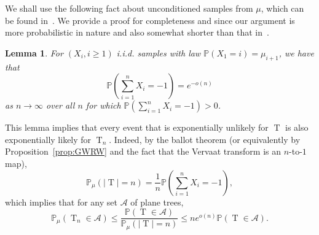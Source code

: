\documentclass[10pt]{amsart}
\newtheorem{lemm}[theo]{Lemma}
\theoremstyle{definition}
\numberwithin{figure}{section}
\renewcommand{\P}{\mathbb{P}}
\DeclareMathOperator{\rtree}{T}
\newcommand\cA{\mathcal{A}}
\begin{document}
We shall use the following fact about unconditioned samples from $\mu$, which can be found in~\cite[Lemmas~14.3 and~14.4]{Jan12}. We provide a proof for completeness and since our argument is {more probabilistic in nature and also} somewhat shorter than that in~\cite{Jan12}.
\begin{lemm}\label{lem:probtree}
For $(X_i,i \ge 1)$ i.i.d. samples with law $\P(X_1=i)=\mu_{i+1}$, we have that
\[
\P\left(\sum_{i=1}^n X_i=-1\right)=e^{-o(n)}
\]
as $n\to \infty$ over all $n$ for which $\P\left(\sum_{i=1}^n X_i=-1\right)>0$.
\end{lemm} This lemma implies that every event that is exponentially unlikely for $\rtree$ is also exponentially likely for $\rtree_n$. Indeed, by the ballot theorem (or equivalently by Proposition~\ref{prop:GWRW} and the fact that the Vervaat transform is an $n$-to-$1$ map),
\[
\P_\mu(|\rtree|=n)=\frac{1}{n}\P\left(\sum_{i=1}^n X_i=-1\right),
\]
which implies that for any set $\cA$ of plane trees,
\[
\P_\mu(\rtree_{n} \in \cA)\leq \frac{\P(\rtree \in \cA)}{\P_\mu(|\rtree|=n)}\leq ne^{o(n)} \P(\rtree \in \cA).
\]
\end{document}
